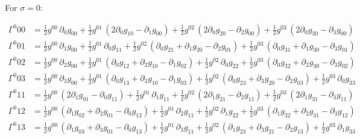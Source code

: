 \documentclass[
]{article}
\begin{document}
For \(\sigma = 0\):

\[\begin{aligned}
\Gamma^{0}_{}{00} &= \tfrac{1}{2} g^{00}\, \partial_{0} g_{00} + \tfrac{1}{2} g^{01}\, \left( 2 \partial_{0} g_{10} - \partial_{1} g_{00} \right) + \tfrac{1}{2} g^{02}\, \left( 2 \partial_{0} g_{20} - \partial_{2} g_{00} \right) + \tfrac{1}{2} g^{03}\, \left( 2 \partial_{0} g_{30} - \partial_{3} g_{00} \right) \\
\Gamma^{0}_{}{01} &= \tfrac{1}{2} g^{00}\, \partial_{1} g_{00} + \tfrac{1}{2} g^{01}\, \partial_{0} g_{11} + \tfrac{1}{2} g^{02}\, \left( \partial_{0} g_{21} + \partial_{1} g_{20} - \partial_{2} g_{01} \right) + \tfrac{1}{2} g^{03}\, \left( \partial_{0} g_{31} + \partial_{1} g_{30} - \partial_{3} g_{01} \right) \\
\Gamma^{0}_{}{02} &= \tfrac{1}{2} g^{00}\, \partial_{2} g_{00} + \tfrac{1}{2} g^{01}\, \left( \partial_{0} g_{12} + \partial_{2} g_{10} - \partial_{1} g_{02} \right) + \tfrac{1}{2} g^{02}\, \partial_{0} g_{22} + \tfrac{1}{2} g^{03}\, \left( \partial_{0} g_{32} + \partial_{2} g_{30} - \partial_{3} g_{02} \right) \\
\Gamma^{0}_{}{03} &= \tfrac{1}{2} g^{00}\, \partial_{3} g_{00} + \tfrac{1}{2} g^{01}\, \left( \partial_{0} g_{13} + \partial_{3} g_{10} - \partial_{1} g_{03} \right) + \tfrac{1}{2} g^{02}\, \left( \partial_{0} g_{23} + \partial_{3} g_{20} - \partial_{2} g_{03} \right) + \tfrac{1}{2} g^{03}\, \partial_{0} g_{33} \\
\Gamma^{0}_{}{11} &= \tfrac{1}{2} g^{00}\, \left( 2 \partial_{1} g_{01} - \partial_{0} g_{11} \right) + \tfrac{1}{2} g^{01}\, \partial_{1} g_{11} + \tfrac{1}{2} g^{02}\, \left( 2 \partial_{1} g_{21} - \partial_{2} g_{11} \right) + \tfrac{1}{2} g^{03}\, \left( 2 \partial_{1} g_{31} - \partial_{3} g_{11} \right) \\
\Gamma^{0}_{}{12} &= \tfrac{1}{2} g^{00}\, \left( \partial_{1} g_{02} + \partial_{2} g_{01} - \partial_{0} g_{12} \right) + \tfrac{1}{2} g^{01}\, \partial_{2} g_{11} + \tfrac{1}{2} g^{02}\, \partial_{1} g_{22} + \tfrac{1}{2} g^{03}\, \left( \partial_{1} g_{32} + \partial_{2} g_{31} - \partial_{3} g_{12} \right) \\
\Gamma^{0}_{}{13} &= \tfrac{1}{2} g^{00}\, \left( \partial_{1} g_{03} + \partial_{3} g_{01} - \partial_{0} g_{13} \right) + \tfrac{1}{2} g^{01}\, \partial_{3} g_{11} + \tfrac{1}{2} g^{02}\, \left( \partial_{1} g_{23} + \partial_{3} g_{21} - \partial_{2} g_{13} \right) + \tfrac{1}{2} g^{03}\, \partial_{1} g_{33} \\

\end{aligned}\]
\end{document}
